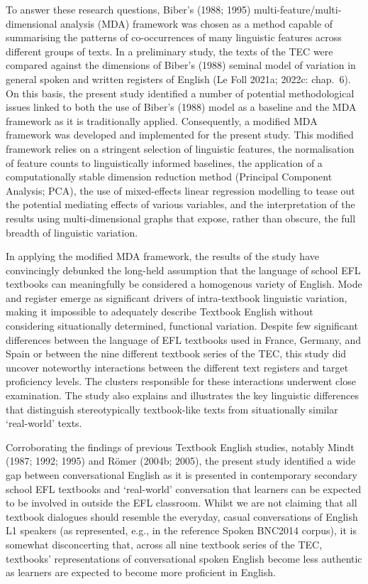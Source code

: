 \documentclass[
  letterpaper,
  DIV=11,
  numbers=noendperiod]{scrreprt}
\begin{document}
To answer these research questions, Biber's (1988; 1995)
multi-feature/multi-dimensional analysis (MDA) framework was chosen as a
method capable of summarising the patterns of co-occurrences of many
linguistic features across different groups of texts. In a preliminary
study, the texts of the TEC were compared against the dimensions of
Biber's (1988) seminal model of variation in general spoken and written
registers of English (Le Foll 2021a; 2022c: chap.~6). On this basis, the
present study identified a number of potential methodological issues
linked to both the use of Biber's (1988) model as a baseline and the MDA
framework as it is traditionally applied. Consequently, a modified MDA
framework was developed and implemented for the present study. This
modified framework relies on a stringent selection of linguistic
features, the normalisation of feature counts to linguistically informed
baselines, the application of a computationally stable dimension
reduction method (Principal Component Analysis; PCA), the use of
mixed-effects linear regression modelling to tease out the potential
mediating effects of various variables, and the interpretation of the
results using multi-dimensional graphs that expose, rather than obscure,
the full breadth of linguistic variation.

In applying the modified MDA framework, the results of the study have
convincingly debunked the long-held assumption that the language of
school EFL textbooks can meaningfully be considered a homogenous variety
of English. Mode and register emerge as significant drivers of
intra-textbook linguistic variation, making it impossible to adequately
describe Textbook English without considering situationally determined,
functional variation. Despite few significant differences between the
language of EFL textbooks used in France, Germany, and Spain or between
the nine different textbook series of the TEC, this study did uncover
noteworthy interactions between the different text registers and target
proficiency levels. The clusters responsible for these interactions
underwent close examination. The study also explains and illustrates the
key linguistic differences that distinguish stereotypically
textbook-like texts from situationally similar `real-world' texts.

Corroborating the findings of previous Textbook English studies, notably
Mindt (1987; 1992; 1995) and Römer (2004b; 2005), the present study
identified a wide gap between conversational English as it is presented
in contemporary secondary school EFL textbooks and `real-world'
conversation that learners can be expected to be involved in outside the
EFL classroom. Whilst we are not claiming that all textbook dialogues
should resemble the everyday, casual conversations of English L1
speakers (as represented, e.g., in the reference Spoken BNC2014 corpus),
it is somewhat disconcerting that, across all nine textbook series of
the TEC, textbooks' representations of conversational spoken English
become less authentic as learners are expected to become more proficient
in English.
\end{document}
